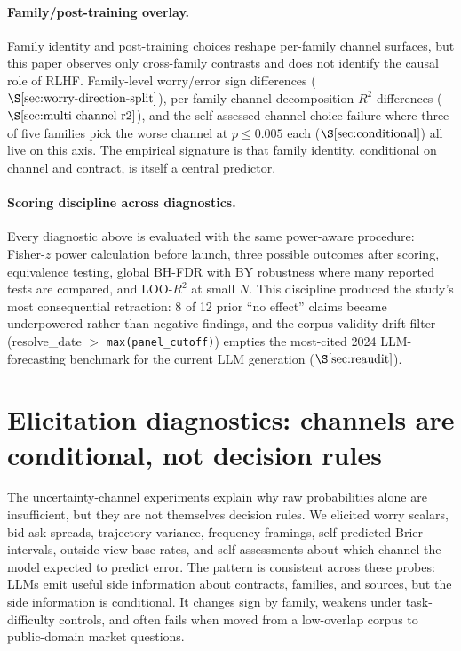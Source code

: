 \documentclass[11pt]{article}
\begin{document}
\paragraph{Family/post-training overlay.} Family identity and post-training choices reshape per-family channel surfaces, but this paper observes only cross-family contrasts and does not identify the causal role of RLHF. Family-level worry/error sign differences ($\S\ref{sec:worry-direction-split}$), per-family channel-decomposition $R^2$ differences ($\S\ref{sec:multi-channel-r2}$), and the self-assessed channel-choice failure where three of five families pick the worse channel at $p \leq 0.005$ each ($\S\ref{sec:conditional}$) all live on this axis. The empirical signature is that family identity, conditional on channel and contract, is itself a central predictor.

\paragraph{Scoring discipline across diagnostics.} Every diagnostic above is evaluated with the same power-aware procedure: Fisher-$z$ power calculation before launch, three possible outcomes after scoring, equivalence testing, global BH-FDR with BY robustness where many reported tests are compared, and LOO-$R^2$ at small $N$. This discipline produced the study's most consequential retraction: 8 of 12 prior ``no effect'' claims became underpowered rather than negative findings, and the corpus-validity-drift filter (resolve\_date $>$ \texttt{max(panel\_cutoff)}) empties the most-cited 2024 LLM-forecasting benchmark for the current LLM generation ($\S\ref{sec:reaudit}$).


\section{Elicitation diagnostics: channels are conditional, not decision rules}
\label{sec:worry-foundation}
\label{sec:worry-direction-split}
\label{sec:cognitive-decoupling}
\label{sec:bid-ask-spread}
\label{sec:channel-orthogonality}
\label{sec:frequency-framing}
\label{sec:worry-mechanism}
\label{sec:multi-channel-r2}
\label{sec:conditional}

The uncertainty-channel experiments explain why raw probabilities alone are insufficient, but they are not themselves decision rules. We elicited worry scalars, bid-ask spreads, trajectory variance, frequency framings, self-predicted Brier intervals, outside-view base rates, and self-assessments about which channel the model expected to predict error. The pattern is consistent across these probes: LLMs emit useful side information about contracts, families, and sources, but the side information is conditional. It changes sign by family, weakens under task-difficulty controls, and often fails when moved from a low-overlap corpus to public-domain market questions.
\end{document}
